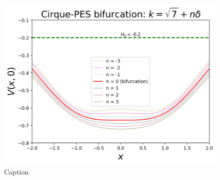 \documentclass[10pt,aps,onecolumn,superscriptaddress]{revtex4-2}
\begin{document}
%
%
\begin{figure}
    \centering
    \includegraphics{pes_profile_around_bifurcation.png}
    \caption{Caption}
\end{figure}




\end{document}
